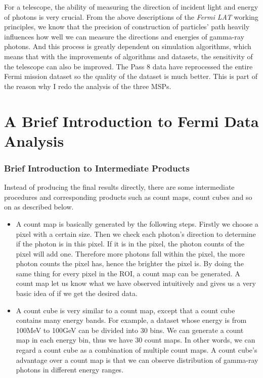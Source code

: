 \documentclass[12pt]{report}
\newcommand{\mayAdd}[1]{
  $<$\colorbox{red}{\textbf{mayAdd}}$>$#1$<$\colorbox{red}{\textbf{/mayAdd}}$>$
}
\begin{document}
        For a telescope, the ability of measuring the direction of incident light and energy of photons is very crucial. 
        From the above descriptions of the \textit{Fermi LAT} working principles, we know that the precision of 
        construction of particles' path heavily influences how well we can measure the directions and energies of 
        gamma-ray photons. 
        And this process is greatly dependent on simulation algorithms, which means that with the 
        improvements of algorithms and datasets,
        the sensitivity of the telescope can also be improved. The Pass 8 data 
        have reprocessed the entire Fermi mission dataset so the quality of the dataset is much better. 
        This is part of the reason why I redo the analysis of the three MSPs.

        \section{A Brief Introduction to Fermi Data Analysis}
          \subsubsection{Brief Introduction to Intermediate Products}
            Instead of producing the final results directly, there are some intermediate procedures and 
            corresponding products such as count maps, count cubes and so on as described below.

          \begin{itemize}
            \item A count map is basically generated by the following steps. Firstly we choose a 
              pixel with a certain size. Then we check each photon's direction to determine if the photon is in this 
              pixel. If it is in the pixel, the photon counts of the pixel will add one. Therefore more photons fall within 
              the pixel, the more photon counts the pixel has, hence the brighter the pixel is. By doing the same thing 
              for every pixel in the ROI, a count map can be generated. 
              A count map let us know what we have observed intuitively and 
              gives us a very basic idea of if we get the desired data. 
            \item A count cube is very similar to a count map, except that a count cube contains many energy
              bands. For example, a dataset whose energy is from 100MeV to 100GeV can be divided into 30 bins. We can
              generate a count map in each energy bin, thus we have 30 count maps. In other words, we can regard a 
              count cube as a combination of multiple count maps. A count cube's advantage over a count map is that we can 
              observe distribution of gamma-ray photons in different energy ranges. 
          \end{itemize}
\end{document}
